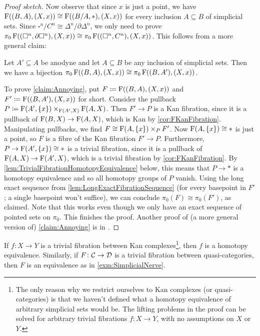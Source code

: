 \begin{proof}[Proof sketch]
	Now observe that since $x$ is just a point, we have $\operatorname{F}((B,A),(X,x))\cong \operatorname{F}((B/A,*),(X,x))$ for every inclusion $A\subseteq B$ of simplicial sets. Since $\square^n/C^n\cong \Delta^n/\partial\Delta^n$, we only need to prove $\pi_0\operatorname{F}((\square^n,\partial\square^n),(X,x))\cong\pi_0\operatorname{F}((\square^n,C^n),(X,x))$. This follows from a more general claim:
	\begin{alphanumerate}\itshape
		\item[\boxtimes] Let $A'\subseteq A$ be anodyne and let $A\subseteq B$ be any inclusion of simplicial sets. Then we have a bijection $\pi_0\operatorname{F}((B,A),(X,x))\cong \pi_0\operatorname{F}((B,A'),(X,x))$.\label{claim:Annoying}
	\end{alphanumerate}
	To prove \cref{claim:Annoying}, put $F\coloneqq \operatorname{F}((B,A),(X,x))$ and $F'\coloneqq \operatorname{F}((B,A'),(X,x))$ for short. Consider the pullback $P\coloneqq \operatorname{F}(A',\{x\})\times_{\operatorname{F}(A',X)}\operatorname{F}(A,X)$. Then $F'\rightarrow P$ is a Kan fibration, since it is a pullback of $\operatorname{F}(B,X)\rightarrow\operatorname{F}(A,X)$, which is Kan by \cref{cor:FKanFibration}. Manipulating pullbacks, we find $F\cong \operatorname{F}(A,\{x\})\times_PF'$. Now $\operatorname{F}(A,\{x\})\cong *$ is just a point, so $F$ is a fibre of the Kan fibration $F'\rightarrow P$. Furthermore, $P\rightarrow \operatorname{F}(A',\{x\})\cong *$ is a trivial fibration, since it is a pullback of $\operatorname{F}(A,X)\rightarrow\operatorname{F}(A',X)$, which is a trivial fibration by \cref{cor:FKanFibration}. By \cref{lem:TrivialFibrationHomotopyEquivalence} below, this means that $P\rightarrow *$ is a homotopy equivalence and so all homotopy groups of $P$ vanish. Using the long exact sequence from \cref{lem:LongExactFibrationSequence} (for every basepoint in $F'$; a single basepoint won't suffice), we can conclude $\pi_0(F)\cong \pi_0(F')$, as claimed. Note that this works even though we only have an exact sequence of pointed sets on $\pi_0$. This finishes the proof. Another proof of (a more general version of) \cref{claim:Annoying} is in \cite[Lemma~V.3.13]{HigherCatsI}.
\end{proof}
\begin{lem}\label{lem:TrivialFibrationHomotopyEquivalence}
	If $f\colon X\rightarrow Y$ is a trivial fibration between Kan complexes\footnote{The only reason why we restrict ourselves to Kan complexes (or quasi-categories) is that we haven't defined what a homotopy equivalence of arbitrary simplicial sets would be. The lifting problems in the proof can be solved for arbitrary trivial fibrations $f\colon X\rightarrow Y$, with no assumptions on $X$ or $Y$.}, then $f$ is a homotopy equivalence. Similarly, if $F\colon \mathcal{C}\rightarrow\mathcal{D}$ is a trivial fibration between quasi-categories, then $F$ is an equivalence as in \cref{exm:SimplicialNerve}.
\end{lem}
